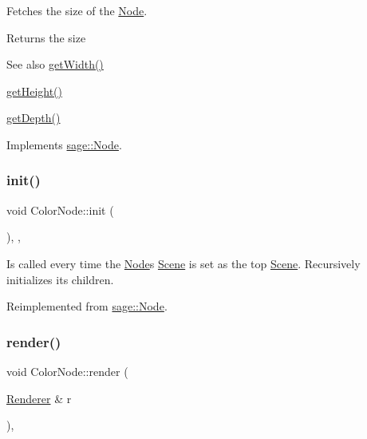 Fetches the size of the \mbox{\hyperlink{classsage_1_1Node}{Node}}. 

\begin{DoxyReturn}{Returns}
the size 
\end{DoxyReturn}
\begin{DoxySeeAlso}{See also}
\mbox{\hyperlink{classsage_1_1Node_a65163ffabcfe9f482282ea37ead6fc5f}{get\+Width()}} 

\mbox{\hyperlink{classsage_1_1Node_a6af5a8378ac8d2c3490adbc2a03f1247}{get\+Height()}} 

\mbox{\hyperlink{classsage_1_1Node_a5c4c28939c7adf7e4a65dbb02c0cbcd3}{get\+Depth()}} 
\end{DoxySeeAlso}


Implements \mbox{\hyperlink{classsage_1_1Node_ad14a04d08b5261c27d3080f6a5e12836}{sage\+::\+Node}}.

\mbox{\label{classsage_1_1ColorNode_a1a5a055be2cc8d15b38c5c25eb489e94}} 
\subsubsection{\texorpdfstring{init()}{init()}}
{\footnotesize\ttfamily void Color\+Node\+::init (\begin{DoxyParamCaption}{ }\end{DoxyParamCaption})\hspace{0.3cm}{\ttfamily [override]}, {\ttfamily [protected]}, {\ttfamily [virtual]}}



Is called every time the \mbox{\hyperlink{classsage_1_1Node}{Node}}\textquotesingle{}s \mbox{\hyperlink{classsage_1_1Scene}{Scene}} is set as the top \mbox{\hyperlink{classsage_1_1Scene}{Scene}}. Recursively initializes its children. 



Reimplemented from \mbox{\hyperlink{classsage_1_1Node_ab87776adae83149e235e37ed469f4e10}{sage\+::\+Node}}.

\mbox{\label{classsage_1_1ColorNode_ac2cf18feb8ab4e55dd68ca8b0c4faabf}} 
\subsubsection{\texorpdfstring{render()}{render()}}
{\footnotesize\ttfamily void Color\+Node\+::render (\begin{DoxyParamCaption}\item[{\mbox{\hyperlink{classsage_1_1Renderer}{Renderer}} \&}]{r }\end{DoxyParamCaption})\hspace{0.3cm}{\ttfamily [override]}, {\ttfamily [virtual]}}



